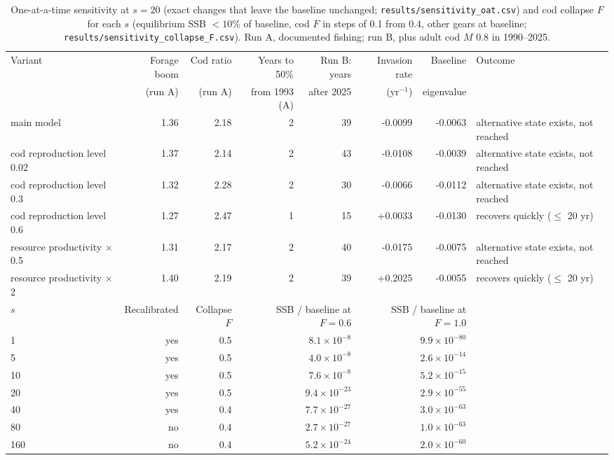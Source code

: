 \documentclass[11pt,letterpaper,fleqn]{article}
\newcommand{\yr}{yr$^{-1}$}
\begin{document}
\begin{table}[p]\caption{One-at-a-time sensitivity at $s=20$ (exact changes that leave the baseline unchanged; \nolinkurl{results/sensitivity_oat.csv}) and cod collapse $F$ for each $s$ (equilibrium SSB $<10$\% of baseline, cod $F$ in steps of 0.1 from 0.4, other gears at baseline; \nolinkurl{results/sensitivity_collapse_F.csv}). Run A, documented fishing; run B, plus adult cod $M$ 0.8 in 1990--2025.}\label{tab:S-oat}
\centering\scriptsize\begin{adjustbox}{max width=\textwidth}\begin{tabular}{@{}lrrrrrrl@{}}\toprule
Variant & Forage boom & Cod ratio & Years to 50\% & Run B: years & Invasion rate & Baseline & Outcome\\
 & (run A) & (run A) & from 1993 (A) & after 2025 & (\yr) & eigenvalue & \\\midrule
main model & 1.36 & 2.18 & 2 & 39 & -0.0099 & -0.0063 & alternative state exists, not reached\\
cod reproduction level 0.02 & 1.37 & 2.14 & 2 & 43 & -0.0108 & -0.0039 & alternative state exists, not reached\\
cod reproduction level 0.3 & 1.32 & 2.28 & 2 & 30 & -0.0066 & -0.0112 & alternative state exists, not reached\\
cod reproduction level 0.6 & 1.27 & 2.47 & 1 & 15 & +0.0033 & -0.0130 & recovers quickly ($\leq$ 20 yr)\\
resource productivity $\times$ 0.5 & 1.31 & 2.17 & 2 & 40 & -0.0175 & -0.0075 & alternative state exists, not reached\\
resource productivity $\times$ 2 & 1.40 & 2.19 & 2 & 39 & +0.2025 & -0.0055 & recovers quickly ($\leq$ 20 yr)\\
\midrule
$s$ & Recalibrated & Collapse $F$ & \multicolumn{2}{r}{SSB / baseline at $F=0.6$} & \multicolumn{2}{r}{SSB / baseline at $F=1.0$} & \\\midrule
1 & yes & 0.5 & \multicolumn{2}{r}{$8.1\times10^{-8}$} & \multicolumn{2}{r}{$9.9\times10^{-80}$} & \\
5 & yes & 0.5 & \multicolumn{2}{r}{$4.0\times10^{-8}$} & \multicolumn{2}{r}{$2.6\times10^{-14}$} & \\
10 & yes & 0.5 & \multicolumn{2}{r}{$7.6\times10^{-8}$} & \multicolumn{2}{r}{$5.2\times10^{-15}$} & \\
20 & yes & 0.5 & \multicolumn{2}{r}{$9.4\times10^{-23}$} & \multicolumn{2}{r}{$2.9\times10^{-55}$} & \\
40 & yes & 0.4 & \multicolumn{2}{r}{$7.7\times10^{-27}$} & \multicolumn{2}{r}{$3.0\times10^{-63}$} & \\
80 & no & 0.4 & \multicolumn{2}{r}{$2.7\times10^{-27}$} & \multicolumn{2}{r}{$1.0\times10^{-63}$} & \\
160 & no & 0.4 & \multicolumn{2}{r}{$5.2\times10^{-24}$} & \multicolumn{2}{r}{$2.0\times10^{-60}$} & \\
\bottomrule\end{tabular}\end{adjustbox}\end{table}
\end{document}
